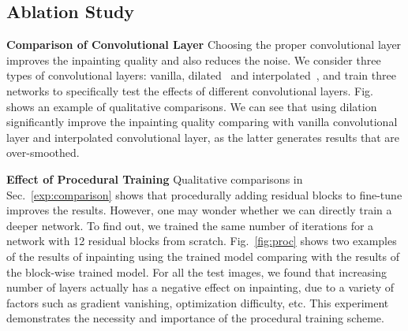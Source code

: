 \subsection{Ablation Study}
\label{exp:study}

\noindent\textbf{Comparison of Convolutional Layer} Choosing the proper convolutional layer improves the inpainting quality and also reduces the noise. We consider three types of convolutional layers: vanilla, dilated~\cite{yu2015multi} and interpolated~\cite{odena2016deconvolution}, and train three networks to specifically test the effects of different convolutional layers. Fig. shows an example of qualitative comparisons. We can see that using dilation significantly improve the inpainting quality comparing with vanilla convolutional layer and interpolated convolutional layer, as the latter generates results that are over-smoothed.  

\noindent\textbf{Effect of Procedural Training} Qualitative comparisons in Sec.~\ref{exp:comparison} shows that procedurally adding residual blocks to fine-tune improves the results. However, one may wonder whether we can directly train a deeper network. To find out, we trained the same number of iterations for a network with 12 residual blocks from scratch. Fig.~\ref{fig:proc} shows two examples of the results of inpainting using the trained model comparing with the results of the block-wise trained model. For all the test images, we found that increasing number of layers actually has a negative effect on inpainting, due to a variety of factors such as gradient vanishing, optimization difficulty, etc. This experiment demonstrates the necessity and importance of the procedural training scheme.

